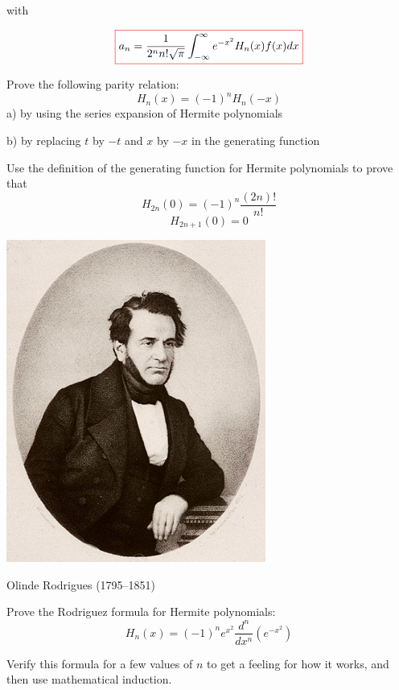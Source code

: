 with

\begin{equation}
\fbox{$\displaystyle
a_n = \frac{1}{2^n n!\sqrt{\pi}} \int_{-\infty}^{\infty} e^{-x^2} H_n(x) f(x) dx
$}
\end{equation} 


\begin{exer}
Prove the following parity relation:
$$H_n(x) = (-1)^nH_n(-x)$$
a) by using the series expansion of Hermite polynomials

b) by replacing $t$ by $-t$ and $x$ by $-x$ in the generating function
\end{exer}


\begin{exer}
Use the definition of the generating function for Hermite polynomials to prove that
$$H_{2n}(0) = (-1)^n \frac{(2n)!}{n!}$$
$$H_{2n+1}(0) = 0$$
\end{exer}

\begin{marginfigure}[-16.0cm]
\includegraphics{hermite/figures/o_rodrigues}
\caption{Olinde Rodrigues (1795–1851)}
\end{marginfigure}

\begin{exer}
Prove the Rodriguez formula for Hermite polynomials:
$$H_n(x) = (-1)^n e^{x^2}\frac{d^n}{d x^n}\left(e^{-x^2}\right)$$
\begin{hnt}
Verify this formula for a few values of $n$ to get a feeling for how it works, and then use mathematical induction.
\end{hnt}  
\end{exer}

